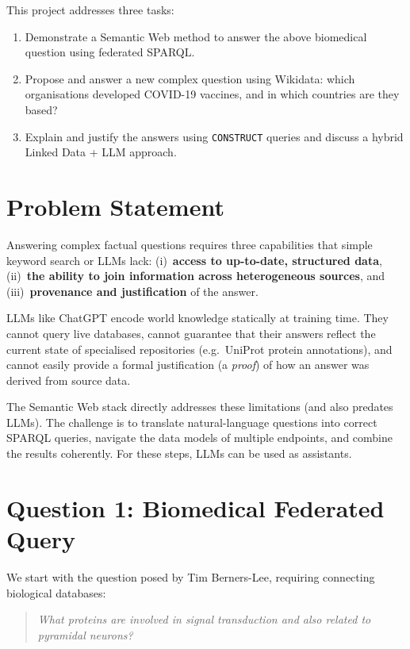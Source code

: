 \documentclass[12pt,a4paper]{article}
\begin{document}
This project addresses three tasks:
\begin{enumerate}[label=\textbf{Q\arabic*.}]
  \item Demonstrate a Semantic Web method to answer the above biomedical
        question using federated SPARQL.
  \item Propose and answer a new complex question using Wikidata: which organisations
        developed COVID-19 vaccines, and in which countries are they based?
  \item Explain and justify the answers using \texttt{CONSTRUCT} queries and
        discuss a hybrid Linked Data + LLM approach.
\end{enumerate}

\newpage
\section{Problem Statement}
\label{sec:problem}
Answering complex factual questions requires three capabilities that simple
keyword search or LLMs lack: (i)~\textbf{access to up-to-date, structured
data}, (ii)~\textbf{the ability to join information across heterogeneous
sources}, and (iii)~\textbf{provenance and justification} of the answer.

LLMs like ChatGPT encode world knowledge statically at training time. They
cannot query live databases, cannot guarantee that their answers reflect the
current state of specialised repositories (e.g.\ UniProt protein annotations),
and cannot easily provide a formal justification (a \emph{proof}) of how an
answer was derived from source data.

The Semantic Web stack directly addresses these limitations (and also predates LLMs).
The challenge is to translate natural-language questions into correct SPARQL
queries, navigate the data models of multiple endpoints, and combine the results
coherently. For these steps, LLMs can be used as assistants.  

\newpage
\section{Question 1: Biomedical Federated Query}
\label{sec:q1}
We start with the question posed by Tim Berners-Lee, requiring connecting biological databases:  
\begin{quote}
\textit{What proteins are involved in signal transduction and also related to
pyramidal neurons?}
\end{quote}
\end{document}
